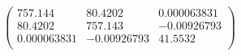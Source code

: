 \documentclass{article}
\begin{document}
\[\left(
\begin{array}{ccc}
 757.144 & 80.4202 & 0.000063831 \\
 80.4202 & 757.143 & -0.00926793 \\
 0.000063831 & -0.00926793 & 41.5532 \\
\end{array}
\right)\]
\end{document}
